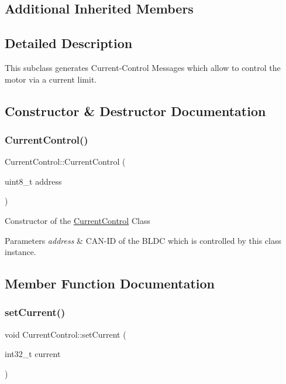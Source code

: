 \subsection*{Additional Inherited Members}


\subsection{Detailed Description}
This subclass generates Current-\/\+Control Messages which allow to control the motor via a current limit. 

\subsection{Constructor \& Destructor Documentation}
\mbox{\label{classCurrentControl_a3e56845d95613d4c55d7b8dde7cc8300}} 
\subsubsection{\texorpdfstring{Current\+Control()}{CurrentControl()}}
{\footnotesize\ttfamily Current\+Control\+::\+Current\+Control (\begin{DoxyParamCaption}\item[{uint8\+\_\+t}]{address }\end{DoxyParamCaption})}

Constructor of the \hyperlink{classCurrentControl}{Current\+Control} Class 
\begin{DoxyParams}{Parameters}
{\em address} & C\+A\+N-\/\+ID of the B\+L\+DC which is controlled by this class instance. \\
\hline
\end{DoxyParams}


\subsection{Member Function Documentation}
\mbox{\label{classCurrentControl_a5096783dd03da0895cd352fc9977736d}} 
\subsubsection{\texorpdfstring{set\+Current()}{setCurrent()}}
{\footnotesize\ttfamily void Current\+Control\+::set\+Current (\begin{DoxyParamCaption}\item[{int32\+\_\+t}]{current }\end{DoxyParamCaption})}

